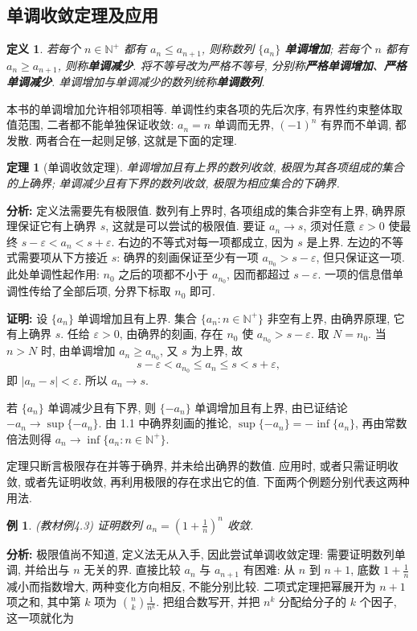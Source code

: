 \documentclass[UTF8,openany]{ctexbook}
\theoremstyle{chinesetextbook}
\newtheorem{definition}{定义}[section]
\newtheorem{example}{例}[section]
\newtheorem{theorem}{定理}[section]
\newenvironment{cnproof}{\par\indent\textbf{证明:} \ignorespaces}{\par}
\begin{document}
\subsection{单调收敛定理及应用}
\begin{definition}
若每个 $n\in\mathbb N^+$ 都有 $a_n\le a_{n+1}$, 则称数列 $\{a_n\}$ \textbf{单调增加}; 若每个 $n$ 都有 $a_n\ge a_{n+1}$, 则称\textbf{单调减少}. 将不等号改为严格不等号, 分别称\textbf{严格单调增加}、\textbf{严格单调减少}. 单调增加与单调减少的数列统称\textbf{单调数列}.
\end{definition}
本书的单调增加允许相邻项相等. 单调性约束各项的先后次序, 有界性约束整体取值范围, 二者都不能单独保证收敛: $a_n=n$ 单调而无界, $(-1)^n$ 有界而不单调, 都发散. 两者合在一起则足够, 这就是下面的定理.
\begin{theorem}[单调收敛定理]
单调增加且有上界的数列收敛, 极限为其各项组成的集合的上确界; 单调减少且有下界的数列收敛, 极限为相应集合的下确界.
\end{theorem}
\par\indent\textbf{分析:} 定义法需要先有极限值. 数列有上界时, 各项组成的集合非空有上界, 确界原理保证它有上确界 $s$, 这就是可以尝试的极限值. 要证 $a_n\to s$, 须对任意 $\varepsilon>0$ 使最终 $s-\varepsilon<a_n<s+\varepsilon$. 右边的不等式对每一项都成立, 因为 $s$ 是上界. 左边的不等式需要项从下方接近 $s$: 确界的刻画保证至少有一项 $a_{n_0}>s-\varepsilon$, 但只保证这一项. 此处单调性起作用: $n_0$ 之后的项都不小于 $a_{n_0}$, 因而都超过 $s-\varepsilon$. 一项的信息借单调性传给了全部后项, 分界下标取 $n_0$ 即可.
\begin{cnproof}
设 $\{a_n\}$ 单调增加且有上界. 集合 $\{a_n:n\in\mathbb N^+\}$ 非空有上界, 由确界原理, 它有上确界 $s$. 任给 $\varepsilon>0$, 由确界的刻画, 存在 $n_0$ 使 $a_{n_0}>s-\varepsilon$. 取 $N=n_0$. 当 $n>N$ 时, 由单调增加 $a_n\ge a_{n_0}$, 又 $s$ 为上界, 故
\[
s-\varepsilon<a_{n_0}\le a_n\le s<s+\varepsilon,
\]
即 $|a_n-s|<\varepsilon$. 所以 $a_n\to s$.

若 $\{a_n\}$ 单调减少且有下界, 则 $\{-a_n\}$ 单调增加且有上界, 由已证结论 $-a_n\to\sup\{-a_n\}$. 由 1.1 中确界刻画的推论, $\sup\{-a_n\}=-\inf\{a_n\}$, 再由常数倍法则得 $a_n\to\inf\{a_n:n\in\mathbb N^+\}$.
\end{cnproof}
定理只断言极限存在并等于确界, 并未给出确界的数值. 应用时, 或者只需证明收敛, 或者先证明收敛, 再利用极限的存在求出它的值. 下面两个例题分别代表这两种用法.
\begin{example}
\textnormal{(教材例4.3)} 证明数列 $\displaystyle a_n=\left(1+\frac1n\right)^n$ 收敛.
\end{example}
\par\indent\textbf{分析:} 极限值尚不知道, 定义法无从入手, 因此尝试单调收敛定理: 需要证明数列单调, 并给出与 $n$ 无关的界. 直接比较 $a_n$ 与 $a_{n+1}$ 有困难: 从 $n$ 到 $n+1$, 底数 $\displaystyle1+\frac1n$ 减小而指数增大, 两种变化方向相反, 不能分别比较. 二项式定理把幂展开为 $n+1$ 项之和, 其中第 $k$ 项为 $\displaystyle\binom nk\frac1{n^k}$. 把组合数写开, 并把 $n^k$ 分配给分子的 $k$ 个因子, 这一项就化为
\end{document}
